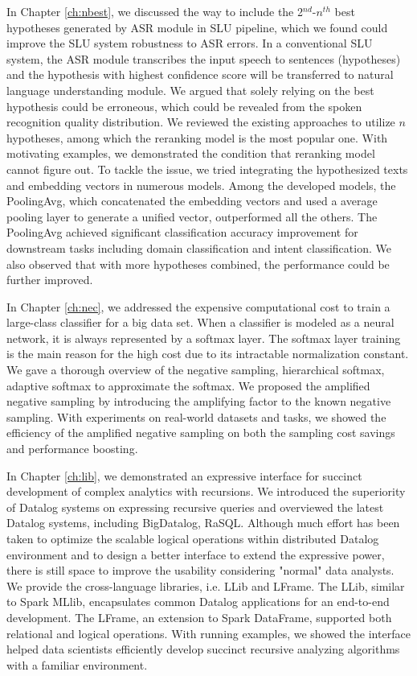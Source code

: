 \documentclass [PhD] {uclathes}
\begin{document}
In Chapter \ref{ch:nbest}, we discussed the way to include the 2$^{nd}$-$n^{th}$ best hypotheses generated by ASR module in SLU pipeline, which we found  could improve the SLU system robustness to ASR errors. In a conventional SLU system, the ASR module transcribes the input speech to sentences (hypotheses)  and the hypothesis with highest confidence score will be transferred to natural language understanding module. We argued that solely relying on the best hypothesis could be erroneous, which could be revealed from  the spoken recognition quality distribution. We reviewed the existing approaches to utilize $n$ hypotheses, among which  the reranking model is the most popular one. With motivating examples, we demonstrated the condition that reranking model cannot figure out. To tackle the issue, we tried integrating the hypothesized texts and embedding vectors in numerous models. Among the developed models, the PoolingAvg, which concatenated the embedding vectors and used a average pooling layer to generate a unified vector, outperformed all the others.  The PoolingAvg achieved significant classification accuracy improvement for downstream tasks including domain classification and intent classification. We also observed that with more hypotheses combined, the performance could be further improved. 

In Chapter \ref{ch:nec}, we addressed the expensive computational cost to train a large-class classifier for a big data set. When a classifier is modeled as a neural network, it is always represented by a softmax layer. The softmax layer training is the main reason for the high cost due to its intractable normalization constant. We gave a thorough overview of  the  negative sampling, hierarchical softmax, adaptive softmax to approximate the softmax.  We proposed the amplified negative sampling by introducing the amplifying factor to the known negative sampling. With experiments on real-world datasets and tasks, we showed the efficiency of the amplified negative sampling on both the sampling cost savings and performance  boosting. 

In Chapter \ref{ch:lib}, we demonstrated an expressive interface for succinct development of complex analytics with recursions.  We introduced the superiority of Datalog systems on expressing recursive queries and overviewed the latest Datalog systems, including BigDatalog, RaSQL. Although much effort has been taken to optimize the scalable logical operations  within distributed Datalog environment and to  design a better interface to extend the expressive power, there is still space to improve the usability considering  "normal" data analysts. We provide the cross-language libraries, i.e. LLib and LFrame. The LLib, similar to Spark MLlib,  encapsulates common Datalog applications for an end-to-end development. The LFrame, an extension to Spark DataFrame, supported both relational and logical operations. With running examples, we showed the interface helped data scientists  efficiently develop succinct recursive analyzing algorithms with a familiar environment.
\end{document}
